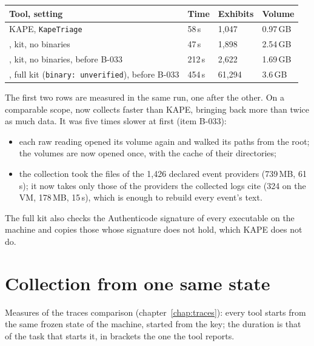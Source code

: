 \documentclass[11pt,a4paper,oneside]{report}
\begin{document}
\begin{longtable}{@{}L{5.4cm}L{2.2cm}L{2.4cm}L{5.0cm}@{}}
\toprule
\textbf{Tool, setting} & \textbf{Time} & \textbf{Exhibits} & \textbf{Volume} \\
\midrule\endhead
KAPE, \texttt{KapeTriage} & 58\,s & 1,047 & 0.97\,GB \\
\wac{}, kit, no binaries & 47\,s & 1,898 & 2.54\,GB \\
\wac{}, kit, no binaries, before B-033 & 212\,s & 2,622 & 1.69\,GB \\
\wac{}, full kit (\texttt{binary: unverified}), before B-033 & 454\,s & 61,294 & 3.6\,GB \\
\bottomrule
\end{longtable}

The first two rows are measured in the same run, one after the other. On a
comparable scope, \wac{} now collects faster than KAPE, bringing back more than
twice as much data. It was five times slower at first (item B-033):
\begin{itemize}
  \item each raw reading opened its volume again and walked its paths from the
        root; the volumes are now opened once, with the cache of their
        directories;
  \item the collection took the files of the 1,426 declared event providers
        (739\,MB, 61\,s); it now takes only those of the providers the
        collected logs cite (324 on the VM, 178\,MB, 15\,s), which is enough to
        rebuild every event's text.
\end{itemize}
The full kit also checks the Authenticode signature of every executable on the
machine and copies those whose signature does not hold, which KAPE does not do.

\section{Collection from one same state}

Measures of the traces comparison (chapter~\ref{chap:traces}): every tool
starts from the same frozen state of the machine, started from the key; the
duration is that of the task that starts it, in brackets the one the tool
reports.
\end{document}
